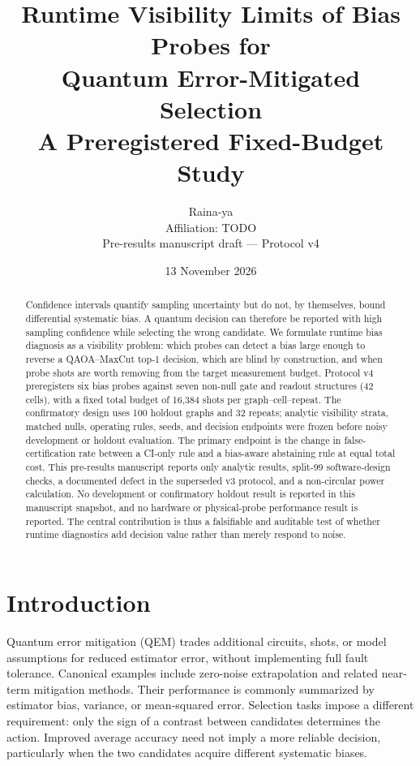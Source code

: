 \documentclass[10pt,twocolumn]{article}
\title{\textbf{Runtime Visibility Limits of Bias Probes for\\
Quantum Error-Mitigated Selection}\vspace{0.35em}\\
\large A Preregistered Fixed-Budget Study}
\author{Raina-ya\\Affiliation: TODO\\[0.3em]
\small Pre-results manuscript draft --- Protocol v4}
\date{13 November 2026}
\begin{document}
\maketitle

\begin{abstract}
Confidence intervals quantify sampling uncertainty but do not, by themselves,
bound differential systematic bias. A quantum decision can therefore be
reported with high sampling confidence while selecting the wrong candidate.
We formulate runtime bias diagnosis as a visibility problem: which probes can
detect a bias large enough to reverse a QAOA--MaxCut top-1 decision, which are
blind by construction, and when probe shots are worth removing from the target
measurement budget. Protocol v4 preregisters six bias probes against seven
non-null gate and readout structures (42 cells), with a fixed total budget of
16,384 shots per graph--cell--repeat. The confirmatory design uses 100 holdout
graphs and 32 repeats; analytic visibility strata, matched nulls, operating
rules, seeds, and decision endpoints were frozen before noisy development or
holdout evaluation. The primary endpoint is the change in false-certification
rate between a CI-only rule and a bias-aware abstaining rule at equal total
cost. This pre-results manuscript reports only analytic results, split-99
software-design checks, a documented defect in the superseded v3 protocol, and
a non-circular power calculation. No development or confirmatory holdout
result is reported in this manuscript snapshot, and no hardware or
physical-probe performance result is reported. The central contribution is
thus a falsifiable and auditable test of whether runtime diagnostics add
decision value rather than merely respond to noise.
\end{abstract}

\section{Introduction}

Quantum error mitigation (QEM) trades additional circuits, shots, or model
assumptions for reduced estimator error, without implementing full fault
tolerance. Canonical examples include zero-noise extrapolation and related
near-term mitigation methods\cite{temme2017,li2017,endo2018}. Their performance
is commonly summarized by estimator bias, variance, or mean-squared error.
Selection tasks impose a different requirement: only the sign of a contrast
between candidates determines the action. Improved average accuracy need not
imply a more reliable decision, particularly when the two candidates acquire
different systematic biases.
\end{document}
